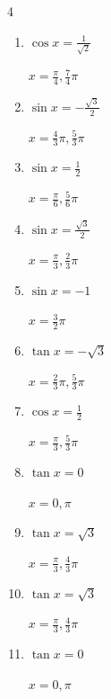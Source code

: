\begin{multicols}{4}
\begin{enumerate}
        $\displaystyle x = \frac{3}{4}\pi , \frac{7}{4}\pi$

  \item $\displaystyle \cos{x}  = \frac{1}{\sqrt{2}}$

        $\displaystyle x = \frac{\pi}{4} , \frac{7}{4}\pi$

  \item $\displaystyle \sin{x}  = -\frac{\sqrt{3}}{2}$

        $\displaystyle x = \frac{4}{3}\pi , \frac{5}{3}\pi$

  \item $\displaystyle \sin{x}  = \frac{1}{2}$

        $\displaystyle x = \frac{\pi}{6} , \frac{5}{6}\pi$

\columnbreak %

\resetques

  \item $\displaystyle \sin{x}  = \frac{\sqrt{3}}{2}$

        $\displaystyle x = \frac{\pi}{3} , \frac{2}{3}\pi$

  \item $\displaystyle \sin{x}  = -1$

        $\displaystyle x = \frac{3}{2}\pi$

  \item $\displaystyle \tan{x}  = -\sqrt{3}$

        $\displaystyle x = \frac{2}{3}\pi , \frac{5}{3}\pi$

  \item $\displaystyle \cos{x}  = \frac{1}{2}$

        $\displaystyle x = \frac{\pi}{3} , \frac{5}{3}\pi$

  \item $\displaystyle \tan{x}  = 0$

        $\displaystyle x = 0 , \pi$

  \item $\displaystyle \tan{x}  = \sqrt{3}$

        $\displaystyle x = \frac{\pi}{3} , \frac{4}{3}\pi$

  \item $\displaystyle \tan{x}  = \sqrt{3}$

        $\displaystyle x = \frac{\pi}{3} , \frac{4}{3}\pi$

  \item $\displaystyle \tan{x}  = 0$

        $\displaystyle x = 0 , \pi$


\end{enumerate}
\end{multicols}
